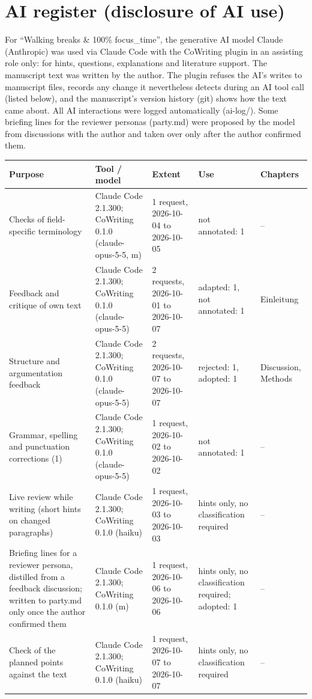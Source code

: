 \section*{AI register (disclosure of AI use)}

For “Walking breaks \& 100\% focus\_time”, the generative AI model Claude (Anthropic) was used via Claude Code with the CoWriting plugin in an assisting role only: for hints, questions, explanations and literature support. The manuscript text was written by the author. The plugin refuses the AI's writes to manuscript files, records any change it nevertheless detects during an AI tool call (listed below), and the manuscript's version history (git) shows how the text came about. All AI interactions were logged automatically (ai-log/). Some briefing lines for the reviewer personas (party.md) were proposed by the model from discussions with the author and taken over only after the author confirmed them.

\begin{tabular}{p{.22\linewidth}p{.18\linewidth}p{.2\linewidth}p{.2\linewidth}p{.1\linewidth}}
\hline
\textbf{Purpose} & \textbf{Tool / model} & \textbf{Extent} & \textbf{Use} & \textbf{Chapters} \\
\hline
Checks of field-specific terminology & Claude Code 2.1.300; CoWriting 0.1.0 (claude-opus-5-5, m) & 1 request, 2026-10-04 to 2026-10-05 & not annotated: 1 & – \\
Feedback and critique of own text & Claude Code 2.1.300; CoWriting 0.1.0 (claude-opus-5-5) & 2 requests, 2026-10-01 to 2026-10-07 & adapted: 1, not annotated: 1 & Einleitung \\
Structure and argumentation feedback & Claude Code 2.1.300; CoWriting 0.1.0 (claude-opus-5-5) & 2 requests, 2026-10-07 to 2026-10-07 & rejected: 1, adopted: 1 & Discussion, Methods \\
Grammar, spelling and punctuation corrections (1) & Claude Code 2.1.300; CoWriting 0.1.0 (claude-opus-5-5) & 1 request, 2026-10-02 to 2026-10-02 & not annotated: 1 & – \\
Live review while writing (short hints on changed paragraphs) & Claude Code 2.1.300; CoWriting 0.1.0 (haiku) & 1 request, 2026-10-03 to 2026-10-03 & hints only, no classification required & – \\
Briefing lines for a reviewer persona, distilled from a feedback discussion; written to party.md only once the author confirmed them & Claude Code 2.1.300; CoWriting 0.1.0 (m) & 1 request, 2026-10-06 to 2026-10-06 & hints only, no classification required; adopted: 1 & – \\
Check of the planned points against the text & Claude Code 2.1.300; CoWriting 0.1.0 (haiku) & 1 request, 2026-10-07 to 2026-10-07 & hints only, no classification required & – \\
\hline
\end{tabular}

